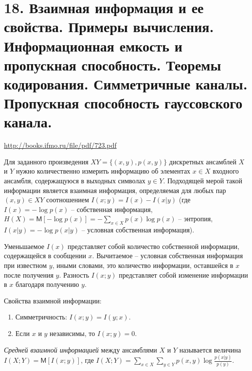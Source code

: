\documentclass[a4paper,12pt]{article}
\newcommand{\MExpect}{\mathsf{M}}
\begin{document}
\section*{18. Взаимная информация и ее свойства. Примеры вычисления. Информационная емкость и пропускная способность. Теоремы кодирования. Симметричные каналы. Пропускная способность гауссовского канала.}
\url{http://books.ifmo.ru/file/pdf/723.pdf}

Для заданного произведения $XY=\{(x,y),p(x,y)\}$ дискретных ансамблей $X$ и $Y$ нужно количественно измерить информацию об элементах $x \in X$ входного ансамбля, содержащуюся в выходных символах $y \in Y$. Подходящей мерой такой информации является взаимная информация, определяемая для любых пар $(x,y) \in{XY}$ соотношением $I(x;y)=I(x)-I(x|y)$ (где $I(x)=-\log{p(x)}$ -- собственная информация, $H(X)=\MExpect[-\log p(x)]=-\sum_{x\in X}{p(x)\log p(x)}$ -- энтропия, $I(x|y)=-\log p(x|y)$ -- условная собственная информация).

Уменьшаемое $I(x)$ представляет собой количество собственной информации, содержащейся в сообщении $x$. Вычитаемое -- условная собственная информация при известном $y$, иными словами, это количество информации, оставшейся в $x$ после получения $y$. Разность $I(x;y)$ представляет собой изменение информации в $x$ благодаря получению $y$.

Свойства взаимной информации:
\begin{enumerate}
\item Симметричность: $I(x;y)=I(y;x)$.
\item Если $x$ и $y$ независимы, то $I(x;y)=0$.
\end{enumerate}

\textit{Средней взаимной информацией} между ансамблями $X$ и $Y$ называется величина $I(X;Y)=\MExpect [I(x;y)]$, где $I(X;Y)=\sum_{x\in X}\sum_{y\in Y}p(x,y)\log\frac{p(x|y)}{p(y)}$.
\end{document}
